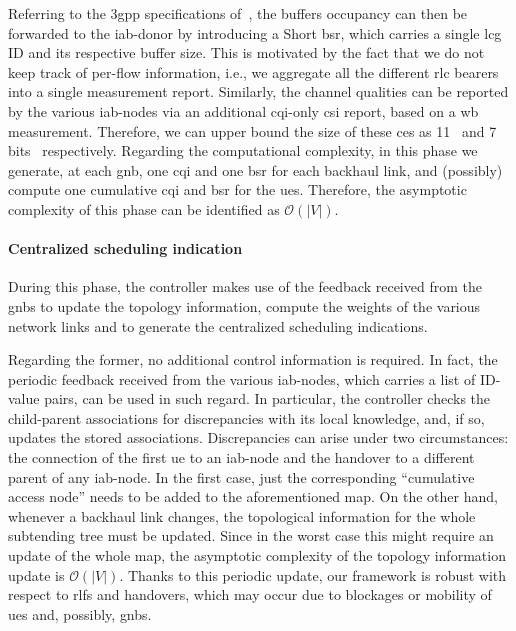 Referring to the \gls{3gpp} specifications of~\cite{3gpp_38_321}, the buffers occupancy can then be forwarded to the \gls{iab}-donor by introducing a Short \gls{bsr}, which carries a single \gls{lcg} ID and its respective buffer size. This is motivated by the fact that we do not keep track of per-flow information, i.e., we aggregate all the different \gls{rlc} bearers into a single measurement report. 
Similarly, the channel qualities can be reported by the various \gls{iab}-nodes via an additional \gls{cqi}-only \gls{csi} report, based on a \gls{wb} measurement. Therefore, we can upper bound the size of these \glspl{ce} as 11~\cite{3gpp_38_321} and 7 bits~\cite{3gpp_r1_1713763} respectively. 
Regarding the computational complexity, in this phase we generate, at each \gls{gnb}, one \gls{cqi} and one \gls{bsr} for each backhaul link, and (possibly) compute one cumulative \gls{cqi} and \gls{bsr} for the \glspl{ue}. Therefore, the asymptotic complexity of this phase can be identified as $ \mathcal{O} \left(\vert V \vert \right)$.

\paragraph{Centralized scheduling indication}
\label{Sec:cent_indic}
During this phase, the controller makes use of the feedback received from the \glspl{gnb} to update the topology information, compute the weights of the various network links and to generate the centralized scheduling indications. 

Regarding the former, no additional control information is required. In fact, the periodic feedback received from the various \gls{iab}-nodes, which carries a list of ID-value pairs, can be used in such regard. In particular, the controller checks the child-parent associations for discrepancies with its local knowledge, and, if so, updates the stored associations. Discrepancies can arise under two circumstances: the connection of the first \gls{ue} to an \gls{iab}-node and the handover to a different parent of any \gls{iab}-node. In the first case, just the corresponding ``cumulative access node'' needs to be added to the aforementioned map. On the other hand, whenever a backhaul link changes, the topological information for the whole subtending tree must be updated. Since in the worst case this might require an update of the whole map, the asymptotic complexity of the topology information update is $\mathcal{O} \left( \vert V \vert \right) $. Thanks to this periodic update, our framework is robust with respect to \glspl{rlf} and handovers, which may occur due to blockages or mobility of \glspl{ue} and, possibly, \glspl{gnb}.

